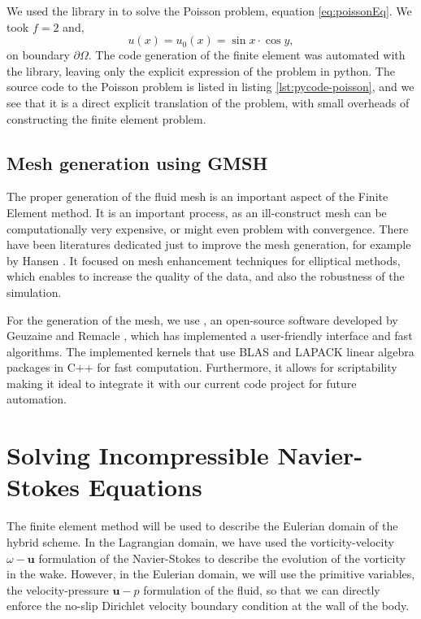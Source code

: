 We used the \dolfin library in \python to solve the Poisson problem, equation \ref{eq:poissonEq}. We took $f=2$ and,
	\begin{equation}
	u(x) = u_0(x) = \sin x \cdot \cos y,
	\end{equation}
on boundary $\partial \Omega$. The code generation of the finite element was automated with the \dolfin library, leaving only the explicit expression of the problem in python. The source code to the Poisson problem is listed in listing \ref{lst:pycode-poisson}, and we see that it is a direct explicit translation of the problem, with small overheads of constructing the finite element problem.

\subsection{Mesh generation using GMSH}

The proper generation of the fluid mesh is an important aspect of the Finite Element method. It is an important process, as an ill-construct mesh can be computationally very expensive, or might even problem with convergence. There have been literatures dedicated just to improve the mesh generation, for example by Hansen \cite{Hansen2005}. It focused on mesh enhancement techniques for elliptical methods, which enables to increase the quality of the data, and also the robustness of the simulation.

For the generation of the mesh, we use \gmsh, an open-source software developed by Geuzaine and Remacle \cite{Geuzaine2009b}, which has implemented a user-friendly interface and fast algorithms. The \gmsh implemented kernels that use \textsc{BLAS} and LAPACK linear algebra packages in C++ for fast computation. Furthermore, it allows for scriptability making it ideal to integrate it with our current \python code project for future automation.

\section{Solving Incompressible Navier-Stokes Equations}
The finite element method will be used to describe the Eulerian domain of the hybrid scheme. In the Lagrangian domain, we have used the vorticity-velocity $\omega-\mathbf{u}$ formulation of the Navier-Stokes to describe the evolution of the vorticity in the wake. However, in the Eulerian domain, we will use the primitive variables, the velocity-pressure $\mathbf{u}-p$ formulation of the fluid, so that we can directly enforce the no-slip Dirichlet velocity boundary condition at the wall of the body. 

